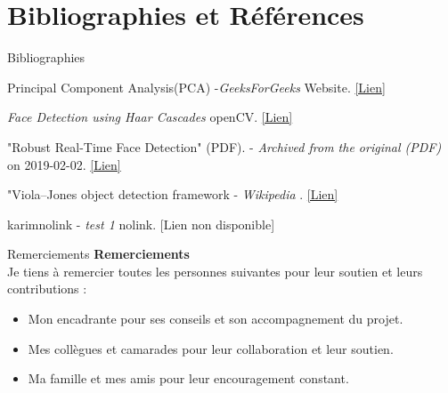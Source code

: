 \documentclass{beamer}
\begin{document}
\section{Bibliographies et Références}
\begin{frame}{Bibliographies}
\begin{thebibliography}{9}

Principal Component Analysis(PCA) -\textit{GeeksForGeeks} Website. 
\href{https://www.geeksforgeeks.org/principal-component-analysis-pca/}{[Lien]} 

\textit{ Face Detection using Haar Cascades} openCV. 
\href{https://docs.opencv.org/3.0-beta/doc/py_tutorials/py_objdetect/py_face_detection/py_face_detection.html}{[Lien]} 

"Robust Real-Time Face Detection" (PDF). -\textit{ Archived from the original (PDF) } on 2019-02-02.
\href{https://web.archive.org/web/20190202042433/http://www.vision.caltech.edu/html-files/EE148-2005-Spring/pprs/viola04ijcv.pdf}{[Lien]} 

"Viola–Jones object detection framework -\textit{ Wikipedia }.
\href{https://en.wikipedia.org/wiki/Viola–Jones_object_detection_framework}{[Lien]} 

karimnolink -\textit{ test 1 } nolink. 
\alert{[Lien non disponible]}

\end{thebibliography}
\end{frame}

\begin{frame}{Remerciements}
    \centering
    \Huge{\textbf{Remerciements}} \\[1cm]
    
    \Large{Je tiens à remercier toutes les personnes suivantes pour leur soutien et leurs contributions :}
    \vspace{0.5cm}
    \begin{itemize}
        \item Mon encadrante pour ses conseils et son accompagnement du projet.
        \item Mes collègues et camarades pour leur collaboration et leur soutien.
        \item Ma famille et mes amis pour leur encouragement constant.
    \end{itemize}
    \vspace{1cm}
    
\end{frame}
\end{document}
